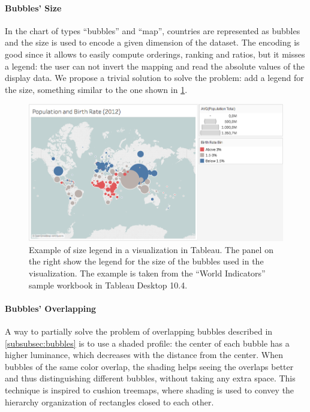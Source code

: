 \paragraph{Bubbles' Size}
In the chart of types ``bubbles'' and ``map'', countries are represented as bubbles and the size is used to encode a given dimension of the dataset.
The encoding is good since it allows to easily compute orderings, ranking and ratios, but it misses a legend:
the user can not invert the mapping and read the absolute values of the display data.
We propose a trivial solution to solve the problem: add a legend for the size, something similar to the one shown in \cref{fig:size-legend}.

\begin{figure}[h]
	\centering
	\includegraphics[width=0.95\columnwidth]{figures/size-legend}
	\caption{Example of size legend in a visualization in Tableau. The panel on the right show the legend for the size of the bubbles used in the visualization. The example is taken from the ``World Indicators'' sample workbook in Tableau Desktop 10.4.}
	\label{fig:size-legend}
\end{figure}

\paragraph{Bubbles' Overlapping}
A way to partially solve the problem of overlapping bubbles described in \cref{subsubsec:bubbles} is to use a shaded profile:
the center of each bubble has a higher luminance, which decreases with the distance from the center.
When bubbles of the same color overlap, the shading helps seeing the overlaps better and thus distinguishing different bubbles, without taking any extra space.
This technique is inspired to cushion treemaps, where shading is used to convey the hierarchy organization of rectangles closed to each other.

